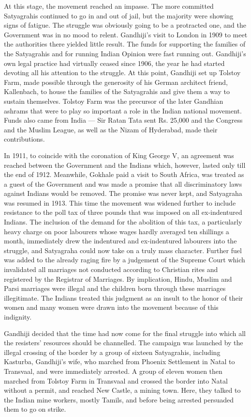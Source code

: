 At this stage, the movement reached an impasse. The more committed Satyagrahis continued to go in and out of jail, but the majority were showing signs of fatigue. The struggle was obviously going to be a protracted one, and the Government was in no mood to relent. Gandhiji's visit to London in 1909 to meet the authorities there yielded little result. The funds for supporting the families of the Satyagrahis and for running Indian Opinion were fast running out. Gandhiji's own legal practice had virtually ceased since 1906, the year he had started devoting all his attention to the struggle. At this point, Gandhiji set up Tolstoy Farm, made possible through the generosity of his German architect friend, Kallenbach, to house the families of the Satyagrahis and give them a way to sustain themselves. Tolstoy Farm was the precursor of the later Gandhian ashrams that were to play so important a role in the Indian national movement. Funds also came from India — Sir Ratan Tata sent Rs. 25,000 and the Congress and the Muslim League, as well as the Nizam of Hyderabad, made their contributions.

In 1911, to coincide with the coronation of King George V, an agreement was reached between the Government and the Indians which, however, lasted only till the end of 1912. Meanwhile, Gokhale paid a visit to South Africa, was treated as a guest of the Government and was made a promise that all discriminatory laws against Indians would be removed. The promise was never kept, and Satyagraha was resumed in 1913. This time the movement was widened further to include resistance to the poll tax of three pounds that was imposed on all ex-indentured Indians. The inclusion of the demand for the abolition of this tax, a particularly heavy charge on poor labourers whose wages hardly averaged ten shillings a month, immediately drew the indentured and ex-indentured labourers into the struggle, and Satyagraha could now take on a truly mass character. Further fuel was added to the already raging fire by a judgement of the Supreme Court which invalidated all marriages not conducted according to Christian rites and registered by the Registrar of Marriages. By implication, Hindu, Muslim and Parsi marriages were illegal and the children born through these marriages illegitimate. The Indians treated this judgment as an insult to the honor of their women and many women were drawn into the movement because of this indignity.

Gandhiji decided that the time had now come for the final struggle into which all the resisters' resources should be channelled. The campaign was launched by the illegal crossing of the border by a group of sixteen Satyagrahis, including Kasturba, Gandhiji's wife, who marched from Phoenix Settlement in Natal to Transvaal, and were immediately arrested. A group of eleven women then marched from Tolstoy Farm in Transvaal and crossed the border into Natal without a permit, and reached New Castle, a mining town. Here, they talked to the Indian mine workers, mostly Tamils, and before being arrested persuaded them to go on strike.

